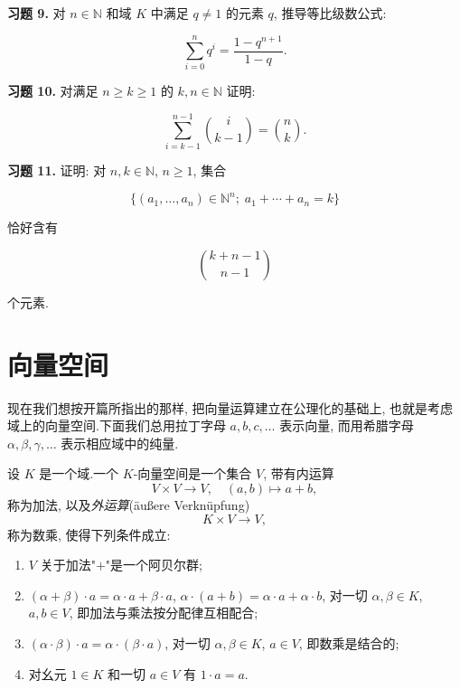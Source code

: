 \medskip
\noindent\textbf{习题 9.} 对 $n \in \mathbb{N}$ 和域 $K$ 中满足 $q \neq 1$ 的元素 $q$, 推导等比级数公式:

\[
\sum_{i = 0}^{n} q^{i} = \frac{1 - q^{n + 1}}{1 - q}\text{.}
\]

\medskip
\noindent\textbf{习题 10.} 对满足 $n \geq k \geq 1$ 的 $k, n \in \mathbb{N}$ 证明:

\[
\sum_{i = k - 1}^{n - 1} \binom{i}{k - 1} = \binom{n}{k}\text{.}
\]

\medskip
\noindent\textbf{习题 11.} 证明: 对 $n, k \in \mathbb{N}$, $n \geq 1$, 集合

\[
\{(a_1, \ldots, a_n) \in \mathbb{N}^n;\; a_1 + \cdots + a_n = k\}
\]

恰好含有

\[
\binom{k + n - 1}{n - 1}
\]

个元素.

\section{向量空间}\label{sec:1.4}

现在我们想按开篇所指出的那样, 把向量运算建立在公理化的基础上, 也就是考虑域上的向量空间.下面我们总用拉丁字母 $a, b, c, \ldots$ 表示向量, 而用希腊字母 $\alpha, \beta, \gamma, \ldots$ 表示相应域中的纯量.

\begin{definition}[$K$-向量空间]\label{def:1.4.1}
设 $K$ 是一个域.一个 $K$-向量空间是一个集合 $V$, 带有内运算
\[
V \times V \longrightarrow V, \quad (a, b) \longmapsto a + b,
\]
称为加法, 以及\emph{外运算}(\textup{äußere Verknüpfung})
\[
K \times V \longrightarrow V,
\]
称为数乘, 使得下列条件成立:
\begin{enumerate}
\item[(i)] $V$ 关于加法"$+$"是一个阿贝尔群;
\item[(ii)] $(\alpha + \beta) \cdot a = \alpha \cdot a + \beta \cdot a$, $\alpha \cdot (a + b) = \alpha \cdot a + \alpha \cdot b$, 对一切 $\alpha, \beta \in K$, $a, b \in V$, 即加法与乘法按分配律互相配合;
\item[(iii)] $(\alpha \cdot \beta) \cdot a = \alpha \cdot (\beta \cdot a)$, 对一切 $\alpha, \beta \in K$, $a \in V$, 即数乘是结合的;
\item[(iv)] 对幺元 $1 \in K$ 和一切 $a \in V$ 有 $1 \cdot a = a$.
\end{enumerate}
\end{definition}

